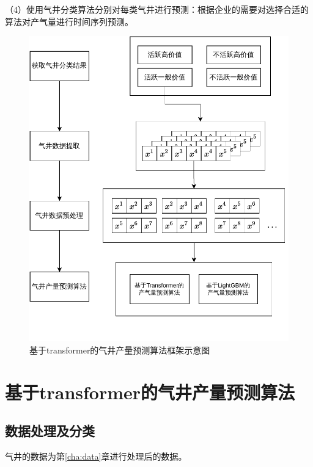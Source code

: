 （4）使用气井分类算法分别对每类气井进行预测：根据企业的需要对选择合适的算法对产气量进行时间序列预测。
\begin{figure}[h]
    \centering
    \includegraphics{figure/第四章框架图.vision.pdf}
    \caption{基于transformer的气井产量预测算法框架示意图}
    \label{fig:TFTprogess}
\end{figure}

\section{基于transformer的气井产量预测算法}

\subsection{数据处理及分类}
\label{sec:datafoc}
气井的数据为第\ref{cha:data}章进行处理后的数据。

